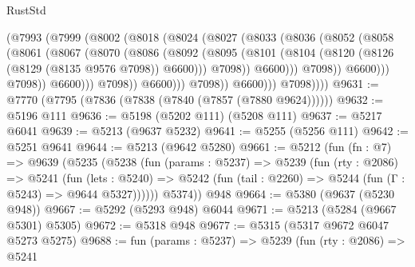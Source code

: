 \begin{lexlean}{RustStd}
\begin{coremodule}
                            (@7993
                              (@7999
                                (@8002
                                  (@8018
                                    (@8024
                                      (@8027
                                        (@8033
                                          (@8036
                                            (@8052
                                              (@8058
                                                (@8061
                                                  (@8067
                                                    (@8070
                                                      (@8086
                                                        (@8092
                                                          (@8095
                                                            (@8101
                                                              (@8104
                                                                (@8120
                                                                  (@8126
                                                                    (@8129 (@8135 @9576 @7098))
                                                                    @6600)))
                                                              @7098))
                                                          @6600)))
                                                    @7098))
                                                @6600)))
                                          @7098))
                                      @6600)))
                                @7098))
                            @6600)))
                      @7098))
                  @6600)))
            @7098))))
@9631 := @7770 (@7795 (@7836 (@7838 (@7840 (@7857 (@7880 @9624))))))
@9632 := @5196 @111
@9636 := @5198 (@5202 @111) (@5208 @111)
@9637 := @5217 @6041
@9639 := @5213 (@9637 @5232)
@9641 := @5255 (@5256 @111)
@9642 := @5251 @9641
@9644 := @5213 (@9642 @5280)
@9661 := @5212
    (fun (fn : @7) =>
    @9639
      (@5235
        (@5238
          (fun (params : @5237) =>
          @5239
            (fun (rty : @2086) =>
            @5241
              (fun (lets : @5240) =>
              @5242 (fun (tail : @2260) => @5244 (fun (Γ : @5243) => @9644 @5327))))))
        @5374))
    @948
@9664 := @5380 (@9637 (@5230 @948))
@9667 := @5292 (@5293 @948) @6044
@9671 := @5213 (@5284 (@9667 @5301) @5305)
@9672 := @5318 @948
@9677 := @5315 (@5317 @9672 @6047 @5273 @5275)
@9688 := fun (params : @5237) =>
  @5239
    (fun (rty : @2086) =>
    @5241

\end{coremodule}
\end{lexlean}
